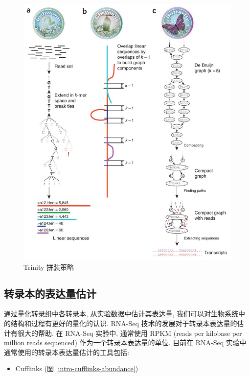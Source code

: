 \begin{figure}[!t]
\centering
\includegraphics[width=\textwidth]{figures/trinity-assembly.jpg}
\caption{Trinity 拼装策略 \cite{grabherr2011full}}
\label{intro-trinity-assembly}
\end{figure}

\subsection{转录本的表达量估计}
通过量化转录组中各转录本, 从实验数据中估计其表达量, 
我们可以对生物系统中的结构和过程有更好的量化的认识. 
RNA-Seq 技术的发展对于转录本表达量的估计有很大的帮助. 
在 RNA-Seq 实验中, 
通常使用 RPKM (reads per kilobase per million reads sequenced) 
\cite{mortazavi2008mapping} 作为一个转录本表达量的单位. 
目前在 RNA-Seq 实验中通常使用的转录本表达量估计的工具包括: 
\begin{itemize}
\item Cufflinks \cite{cufflinks.2010} (图 \ref{intro-cufflinks-abundance})
\end{itemize}

